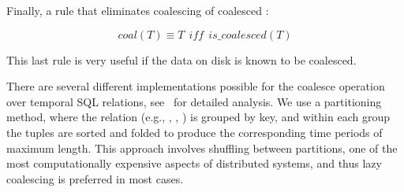 Finally, a rule that eliminates coalescing of coalesced \tgs:

\begin{equation}
coal(T) \equiv T~~iff~~is\_coalesced(T)
\label{rul:coalr11}
\end{equation}

This last rule is very useful if the data on disk is known to be
coalesced.

There are several different implementations possible for the coalesce
operation over temporal SQL relations,
see~\cite{DBLP:conf/vldb/BohlenSS96} for detailed analysis.  We use a
partitioning method, where the relation (e.g., \tv, \te, \trg) is
grouped by key, and within each group the tuples are sorted and folded
to produce the corresponding time periods of maximum length.  This
approach involves shuffling between partitions, one of the most
computationally expensive aspects of distributed systems, and thus
lazy coalescing is preferred in most cases.
